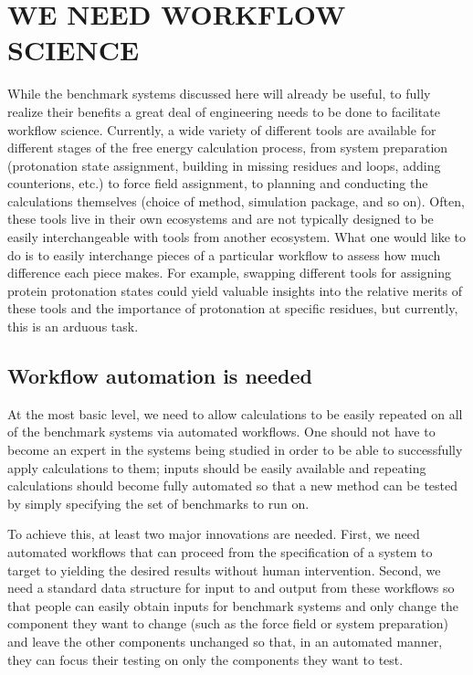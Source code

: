 \documentclass[aps,pre,twocolumn,nofootinbib,superscriptaddress,10pt, final,tightenlines]{revtex4-1}
\begin{document}
\section{WE NEED WORKFLOW SCIENCE}

While the benchmark systems discussed here will already be useful, to fully realize their benefits a great deal of engineering needs to be done to facilitate workflow science. 
Currently, a wide variety of different tools are available for different stages of the free energy calculation process, from system preparation (protonation state assignment, building in missing residues and loops, adding counterions, etc.) to force field assignment, to planning and conducting the calculations themselves (choice of method, simulation package, and so on). 
Often, these tools live in their own ecosystems and are not typically designed to be easily interchangeable with tools from another ecosystem.  
What one would like to do is to easily interchange pieces of a particular workflow to assess how much difference each piece makes. 
For example, swapping different tools for assigning protein protonation states could yield valuable insights into the relative merits of these tools and the importance of protonation at specific residues, but currently, this is an arduous task.

\subsection{Workflow automation is needed}

At the most basic level, we need to allow calculations to be easily repeated on all of the benchmark systems via automated workflows.  
One should not have to become an expert in the systems being studied in order to be able to successfully apply calculations to them; inputs should be easily available and repeating calculations should become fully automated so that a new method can be tested by simply specifying the set of benchmarks to run on.

To achieve this, at least two major innovations are needed. 
First, we need automated workflows that can proceed from the specification of a system to target to yielding the desired results without human intervention. 
Second, we need a standard data structure for input to and output from these workflows so that people can easily obtain inputs for benchmark systems and only change the component they want to change (such as the force field or system preparation) and leave the other components unchanged so that, in an automated manner, they can focus their testing on only the components they want to test. 
\end{document}
